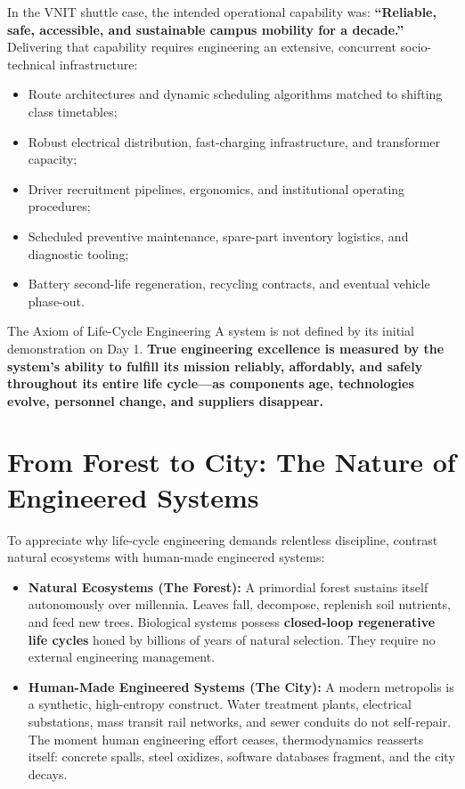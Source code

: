 In the VNIT shuttle case, the intended operational capability was: \textbf{``Reliable, safe, accessible, and sustainable campus mobility for a decade.''}
Delivering that capability requires engineering an extensive, concurrent socio-technical infrastructure:
\begin{itemize}[leftmargin=1.5em]
    \item Route architectures and dynamic scheduling algorithms matched to shifting class timetables;
    \item Robust electrical distribution, fast-charging infrastructure, and transformer capacity;
    \item Driver recruitment pipelines, ergonomics, and institutional operating procedures;
    \item Scheduled preventive maintenance, spare-part inventory logistics, and diagnostic tooling;
    \item Battery second-life regeneration, recycling contracts, and eventual vehicle phase-out.
\end{itemize}

\begin{takeawaybox}{The Axiom of Life-Cycle Engineering}
A system is not defined by its initial demonstration on Day 1. 
\textbf{True engineering excellence is measured by the system's ability to fulfill its mission reliably, affordably, and safely throughout its entire life cycle—as components age, technologies evolve, personnel change, and suppliers disappear.}
\end{takeawaybox}

\section{From Forest to City: The Nature of Engineered Systems}
\label{sec:nature_to_city}

To appreciate why life-cycle engineering demands relentless discipline, contrast natural ecosystems with human-made engineered systems:

\begin{itemize}[leftmargin=1.5em]
    \item \textbf{Natural Ecosystems (The Forest):} A primordial forest sustains itself autonomously over millennia. Leaves fall, decompose, replenish soil nutrients, and feed new trees. Biological systems possess \textbf{closed-loop regenerative life cycles} honed by billions of years of natural selection. They require no external engineering management.
    \item \textbf{Human-Made Engineered Systems (The City):} A modern metropolis is a synthetic, high-entropy construct. Water treatment plants, electrical substations, mass transit rail networks, and sewer conduits do not self-repair. The moment human engineering effort ceases, thermodynamics reasserts itself: concrete spalls, steel oxidizes, software databases fragment, and the city decays.
\end{itemize}

